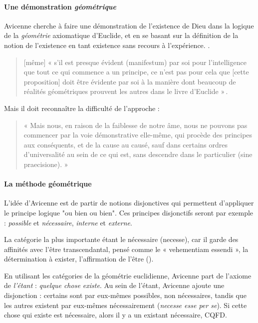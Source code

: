 \paragraph{Une démonstration \textit{géométrique}} Avicenne cherche à faire une démonstration de l'existence de Dieu dans la logique de la \textit{géométrie} axiomatique d'Euclide, et en se basant sur la définition de la notion de l'existence en tant existence sans recours à l'expérience.
. 
\begin{quote}
    [même] « s’il est presque évident (manifestum) par soi pour l’intelligence que tout ce qui commence a un principe, ce n’est pas pour cela que [cette proposition] doit être évidente par soi à la manière dont beaucoup de réalités géométriques prouvent les autres dans le livre d’Euclide » .
\end{quote} 
 

Mais il doit reconnaître la difficulté de l'approche : 
 
\begin{quote}
     « Mais nous, en raison de la faiblesse de notre âme, nous ne pouvons pas commencer par la voie démonstrative elle-même, qui procède des principes aux conséquents, et de la cause au causé, sauf dans certains ordres d’universalité au sein de ce qui est, sans descendre dans le particulier (sine praecisione). »  
\end{quote}

\paragraph{La méthode géométrique} L'idée d'Avicenne est de partir de notions disjonctives qui permettent d'appliquer le principe logique "ou bien ou bien". Ces principes disjonctifs seront par exemple : \textit{possible} et \textit{nécessaire}, \textit{interne} et \textit{externe}.  

La catégorie la plus importante étant  le nécessaire (necesse), car il garde des affinités avec l’être transcendantal, pensé comme le « vehementiam essendi », la détermination à exister, l’affirmation de l’être (\cite{Boulnois:EtreRepresentationAvicenne}).

En utilisant les catégories de la géométrie euclidienne, Avicenne part de l'axiome de \textit{l'étant} : \textit{quelque chose existe}. 
Au sein de l’étant, Avicenne ajoute une disjonction : certains sont par eux-mêmes possibles, non nécessaires, tandis que les autres existent par eux-mêmes nécessairement (\textit{necesse esse per se}). Si cette chose qui existe est nécessaire, alors il y a un existant nécessaire, CQFD. 

